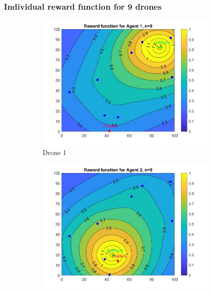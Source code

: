 \subsubsection{Individual reward function for 9 drones}

\begin{figure}[h]
    
    \centering
   \begin{subfigure}[b]{0.3\textwidth}
         \centering
         \includegraphics[width=\textwidth]{figures/RewardFunction1.jpg}
         \caption{Drone 1}
         \label{fig:r1}
     \end{subfigure}
     \hfill
     \begin{subfigure}[b]{0.3\textwidth}
         \centering
         \includegraphics[width=\textwidth]{figures/RewardFunction2.jpg}

\end{subfigure}
\end{figure}
